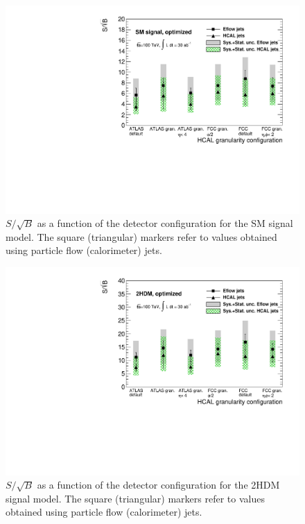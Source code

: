 \begin{figure}[h]
	\centering
	\includegraphics[width=\linewidth]{./images/SSBvsGran_SM_Opt.pdf}
	\caption{$S/\sqrt{B}$ as a function of the detector configuration for the SM signal model. The square (triangular) markers refer to values obtained using particle flow (calorimeter) jets.}
	\label{fig:SSB_gran}
\end{figure}

\begin{figure}[h]
	\centering
	\includegraphics[width=\linewidth]{./images/SSBvsGran_2HDM_Opt.pdf}
	\caption{$S/\sqrt{B}$ as a function of the detector configuration for the 2HDM signal model. The square (triangular) markers refer to values obtained using particle flow (calorimeter) jets.}
	\label{fig:SSB_gran_2HDM}
\end{figure}

